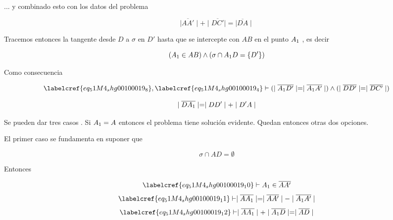 ... y combinado esto con los datos del problema

\begin{equation} \label{eq_51M4_shg00100019_7}
	\mid\overline{AA'}\mid + \mid\overline{DC'}\mid = \mid\overline{DA}\mid
\end{equation}

Tracemos entonces la tangente desde $D$ a $\sigma$ en $D'$ hasta que se intercepte con $AB$ en el punto $A\textsubscript{1}$ , es decir

\begin{equation} \label{eq_51M4_shg00100019_8}
	(A\textsubscript{1} \in AB) \land (\sigma \cap A\textsubscript{1}D = \{D'\})\\
\end{equation}

Como consecuencia 

\begin{equation} \label{eq_51M4_shg00100019_9}
\begin{gathered}
	 \labelcref{eq_51M4_shg00100019_8}, \labelcref{eq_51M4_shg00100019_4} \vdash (\mid\overline{A\textsubscript{1}D'}\mid = \mid\overline{A\textsubscript{1}A'}\mid) \land (\mid\overline{DD'}\mid = \mid\overline{DC'}\mid)
\end{gathered}
\end{equation}

\begin{equation} \label{eq_51M4_shg00100019_9a}
	\mid\overline{DA\textsubscript{1}}\mid = \mid DD'\mid + \mid D'A \mid
\end{equation}

Se pueden dar tres casos . Si $A\textsubscript{1} = A$ entonces el problema tiene solución evidente. Quedan entonces otras dos opciones.

El primer caso se fundamenta en suponer que

\begin{equation} \label{eq_51M4_shg00100019_10}
	\sigma \cap AD = \emptyset
\end{equation}

Entonces 

\begin{equation} \label{eq_51M4_shg00100019_11}
	\labelcref{eq_51M4_shg00100019_10} \vdash A\textsubscript{1} \in \overline{AA'}
\end{equation}
\begin{equation} \label{eq_51M4_shg00100019_12}
	\labelcref{eq_51M4_shg00100019_11} \vdash \mid\overline{AA\textsubscript{1}}\mid = \mid\overline{AA'}\mid - \mid\overline{A\textsubscript{1}A'}\mid
\end{equation}
\begin{equation} \label{eq_51M4_shg00100019_13}
	\labelcref{eq_51M4_shg00100019_12} \vdash \mid\overline{AA\textsubscript{1}}\mid + \mid\overline{A\textsubscript{1}D}\mid = \mid\overline{AD}\mid
\end{equation}

